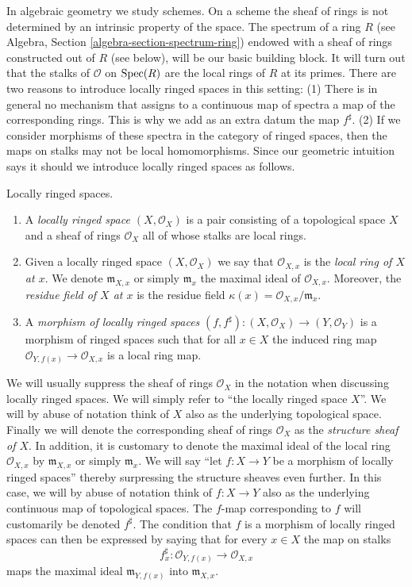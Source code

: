 \medskip\noindent
In algebraic geometry we study schemes. On a scheme the sheaf of rings
is not determined by an intrinsic property of the space.
The spectrum of a ring $R$
(see Algebra, Section \ref{algebra-section-spectrum-ring}) endowed
with a sheaf of rings constructed out of $R$ (see below),
will be our basic building block. It will turn out that
the stalks of $\mathcal{O}$ on $\mathop{\rm Spec}(R)$ are the local
rings of $R$ at its primes. There are two reasons to introduce
locally ringed spaces in this setting: (1) There is in general
no mechanism that assigns to a continuous map of spectra a
map of the corresponding rings. This is why we add as an extra datum
the map $f^\sharp$. (2) If we consider morphisms
of these spectra in the category of ringed spaces, then the
maps on stalks may not be local homomorphisms. Since our
geometric intuition says it should we introduce locally ringed spaces
as follows.

\begin{definition}
\label{definition-locally-ringed-space}
Locally ringed spaces.
\begin{enumerate}
\item A {\it locally ringed space $(X, \mathcal{O}_X)$}
is a pair consisting of a
topological space $X$ and a sheaf of rings $\mathcal{O}_X$ all of whose stalks
are local rings.
\item Given a locally ringed space $(X, \mathcal{O}_X)$ we say that
$\mathcal{O}_{X, x}$ is the {\it local ring of $X$ at $x$}.
We denote $\mathfrak{m}_{X, x}$ or simply $\mathfrak{m}_x$
the maximal ideal of $\mathcal{O}_{X, x}$. Moreover, the
{\it residue field of $X$ at $x$} is the residue field
$\kappa(x) = \mathcal{O}_{X, x}/\mathfrak{m}_x$.
\item A {\it morphism of locally ringed spaces}
$(f, f^\sharp) : (X, \mathcal{O}_X) \to (Y, \mathcal{O}_Y)$
is a morphism of ringed spaces such that for all $x \in X$
the induced ring map $\mathcal{O}_{Y, f(x)} \to \mathcal{O}_{X, x}$ is a
local ring map.
\end{enumerate}
\end{definition}

\noindent
We will usually suppress the sheaf of rings $\mathcal{O}_X$
in the notation when discussing locally ringed spaces. We will
simply refer to ``the locally ringed space $X$''.
We will by abuse of notation think of $X$ also as
the underlying topological space. Finally we will denote
the corresponding sheaf of rings
$\mathcal{O}_X$ as the {\it structure sheaf of $X$}.
In addition, it is customary to denote the maximal ideal
of the local ring $\mathcal{O}_{X, x}$ by
$\mathfrak{m}_{X, x}$ or simply $\mathfrak{m}_x$.
We will say ``let $f : X \to Y$ be a morphism of locally ringed
spaces'' thereby surpressing the structure sheaves even further.
In this case, we will by abuse of notation think of $f : X\to Y$
also as the underlying continuous map of topological spaces.
The $f$-map corresponding to $f$ will customarily
be denoted $f^\sharp$. The condition that $f$ is a morphism
of locally ringed spaces can then be expressed by saying that
for every $x\in X$ the map on stalks
$$
f^\sharp_x : \mathcal{O}_{Y, f(x)} \longrightarrow \mathcal{O}_{X, x}
$$
maps the maximal ideal $\mathfrak m_{Y, f(x)}$ into
$\mathfrak m_{X, x}$.

